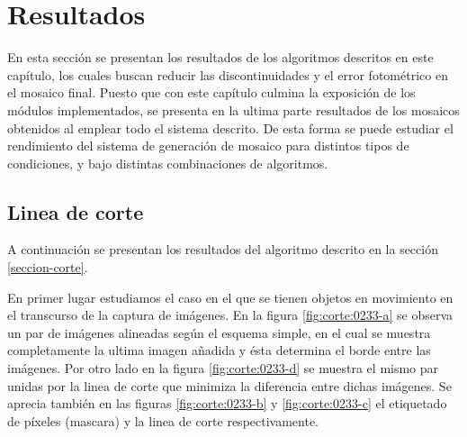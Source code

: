 \section{Resultados}

En esta sección se presentan los resultados de los algoritmos descritos en este capítulo, los cuales buscan reducir las discontinuidades y el error fotométrico en el mosaico final. Puesto que con este capítulo culmina la exposición de los módulos implementados, se presenta en la ultima parte resultados de los mosaicos obtenidos al emplear todo el sistema descrito. De esta forma se puede estudiar el rendimiento del sistema de generación de mosaico para distintos tipos de condiciones, y bajo distintas combinaciones de algoritmos.

\subsection*{Linea de corte}

A continuación se presentan los resultados del algoritmo descrito en la sección \ref{seccion-corte}.

En primer lugar estudiamos el caso en el que se tienen objetos en movimiento en el transcurso de la captura de imágenes. En la figura \ref{fig:corte:0233-a} se observa un par de imágenes alineadas según el esquema simple, en el cual se muestra completamente la ultima imagen añadida y ésta determina el borde entre las imágenes. Por otro lado en la figura \ref{fig:corte:0233-d} se muestra el mismo par unidas por la linea de corte que minimiza la diferencia entre dichas imágenes. Se aprecia también en las figuras \ref{fig:corte:0233-b} y \ref{fig:corte:0233-c} el etiquetado de píxeles (mascara) y la linea de corte respectivamente.

\begin{figure}[H]
	\centering     %
	\hspace{0.005\textwidth}%
	

	\caption[Ejemplo de fusión pirámidal]{}
	\label{imagen:cut:0233}
\end{figure}

